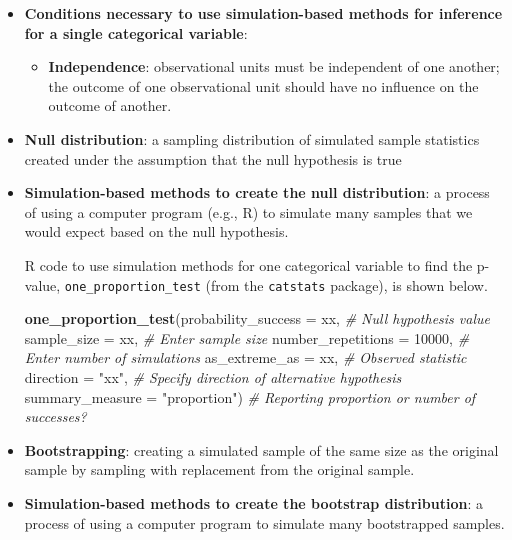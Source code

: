 \documentclass[
]{report}
\newenvironment{Shaded}{\begin{snugshade}}{\end{snugshade}}
\newcommand{\AttributeTok}[1]{\textcolor[rgb]{0.13,0.29,0.53}{#1}}
\newcommand{\CommentTok}[1]{\textcolor[rgb]{0.56,0.35,0.01}{\textit{#1}}}
\newcommand{\DecValTok}[1]{\textcolor[rgb]{0.00,0.00,0.81}{#1}}
\newcommand{\FunctionTok}[1]{\textcolor[rgb]{0.13,0.29,0.53}{\textbf{#1}}}
\newcommand{\NormalTok}[1]{#1}
\newcommand{\StringTok}[1]{\textcolor[rgb]{0.31,0.60,0.02}{#1}}
\providecommand{\tightlist}{%
  \setlength{\itemsep}{0pt}\setlength{\parskip}{0pt}}
\begin{document}
\begin{itemize}
\item
  \textbf{Conditions necessary to use simulation-based methods for inference for a single categorical variable}:

  \begin{itemize}
  \tightlist
  \item
    \textbf{Independence}: observational units must be independent of one another; the outcome of one observational unit should have no influence on the outcome of another.
  \end{itemize}
\item
  \textbf{Null distribution}: a sampling distribution of simulated sample statistics created under the assumption that the null hypothesis is true
\item
  \textbf{Simulation-based methods to create the null distribution}: a process of using a computer program (e.g., R) to simulate many samples that we would expect based on the null hypothesis.

  R code to use simulation methods for one categorical variable to find the p-value, \texttt{one\_proportion\_test} (from the \texttt{catstats} package), is shown below.

\begin{Shaded}
\begin{Highlighting}[]
\FunctionTok{one\_proportion\_test}\NormalTok{(}\AttributeTok{probability\_success =}\NormalTok{ xx, }\CommentTok{\# Null hypothesis value}
      \AttributeTok{sample\_size =}\NormalTok{ xx, }\CommentTok{\# Enter sample size}
      \AttributeTok{number\_repetitions =} \DecValTok{10000}\NormalTok{, }\CommentTok{\# Enter number of simulations}
      \AttributeTok{as\_extreme\_as =}\NormalTok{ xx, }\CommentTok{\# Observed statistic}
      \AttributeTok{direction =} \StringTok{"xx"}\NormalTok{, }\CommentTok{\# Specify direction of alternative hypothesis}
      \AttributeTok{summary\_measure =} \StringTok{"proportion"}\NormalTok{) }\CommentTok{\# Reporting proportion or number of successes?}
\end{Highlighting}
\end{Shaded}
\item
  \textbf{Bootstrapping}: creating a simulated sample of the same size as the original sample by sampling with replacement from the original sample.
\item
  \textbf{Simulation-based methods to create the bootstrap distribution}: a process of using a computer program to simulate many bootstrapped samples.


\end{itemize}
\end{document}
